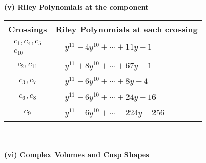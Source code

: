 \documentclass[1p]{elsarticle_modified}
\theoremstyle{definition}
\begin{document}
\flushleft \textbf{(v) Riley Polynomials at the component}\newline \\
\begin{tabular}{m{50pt}|m{274pt}}
Crossings & \hspace{64pt}Riley Polynomials at each crossing \\
\hline $$\begin{aligned}c_{1},c_{4},c_{5}\\c_{10}\end{aligned}$$&$\begin{aligned}
&y^{11}-4 y^{10}+\cdots+11 y-1
\end{aligned}$\\
\hline $$\begin{aligned}c_{2},c_{11}\end{aligned}$$&$\begin{aligned}
&y^{11}+8 y^{10}+\cdots+67 y-1
\end{aligned}$\\
\hline $$\begin{aligned}c_{3},c_{7}\end{aligned}$$&$\begin{aligned}
&y^{11}-6 y^{10}+\cdots+8 y-4
\end{aligned}$\\
\hline $$\begin{aligned}c_{6},c_{8}\end{aligned}$$&$\begin{aligned}
&y^{11}-6 y^{10}+\cdots+24 y-16
\end{aligned}$\\
\hline $$\begin{aligned}c_{9}\end{aligned}$$&$\begin{aligned}
&y^{11}-6 y^{10}+\cdots-224 y-256
\end{aligned}$\\
\hline
\end{tabular}\\~\\
\newpage\flushleft \textbf{(vi) Complex Volumes and Cusp Shapes}
\end{document}
